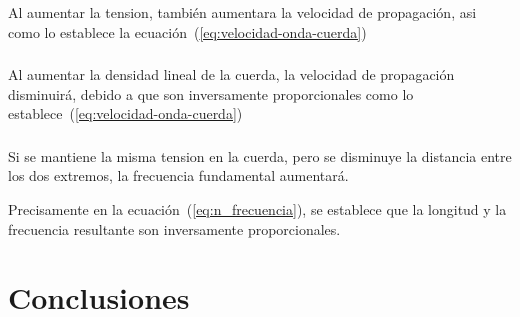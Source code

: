 \documentclass[twocolumn, 12pt]{article}
\begin{document}
\subsubsection{}

Al aumentar la tension, también aumentara la velocidad de
propagación, asi como lo establece la
ecuación~(\ref{eq:velocidad-onda-cuerda})

\subsubsection{}

Al aumentar la densidad lineal de la cuerda, la velocidad
de propagación disminuirá, debido a que son inversamente
proporcionales como lo
establece~(\ref{eq:velocidad-onda-cuerda})

\subsubsection{}

Si se mantiene la misma tension en la cuerda, pero se
disminuye la distancia entre los dos extremos, la
frecuencia fundamental aumentará.

Precisamente en la ecuación~(\ref{eq:n_frecuencia}), se
establece que la longitud y la frecuencia resultante son
inversamente proporcionales.

\section{Conclusiones}

\printbibliography
\end{document}
